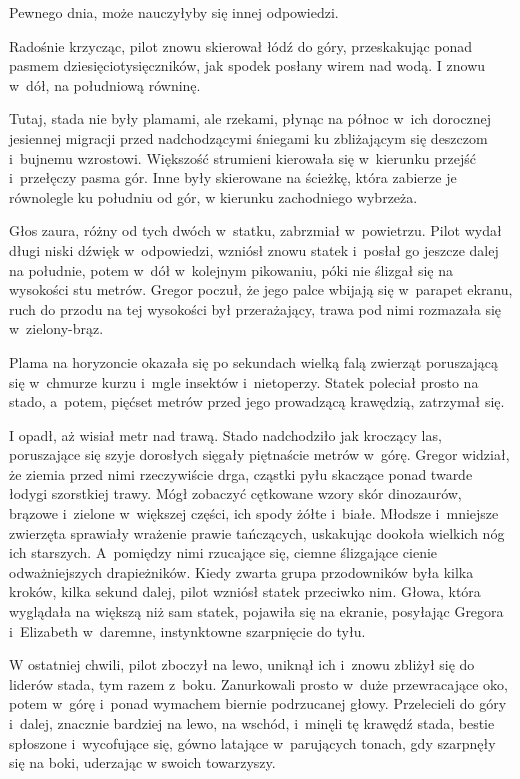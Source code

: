 \documentclass[oneside,polish,12pt,sfheadings]{mwbk}
\begin{document}
Pewnego dnia, może nauczyłyby się innej odpowiedzi.

Radośnie krzycząc, pilot znowu skierował łódź do góry, przeskakując
ponad pasmem dziesięciotysięczników, jak spodek posłany wirem nad wodą.
I znowu w~dół, na południową równinę.

Tutaj, stada nie były plamami, ale rzekami, płynąc na północ w~ich
dorocznej jesiennej migracji przed nadchodzącymi śniegami ku
zbliżającym się deszczom i~bujnemu wzrostowi. Większość strumieni
kierowała się w~kierunku przejść i~przełęczy pasma gór. Inne były
skierowane na ścieżkę, która zabierze je równolegle ku południu od gór,
w kierunku zachodniego wybrzeża.

Głos zaura, różny od tych dwóch w~statku, zabrzmiał w~powietrzu. Pilot
wydał długi niski dźwięk w~odpowiedzi, wzniósł znowu statek i~posłał go
jeszcze dalej na południe, potem w~dół w~kolejnym pikowaniu, póki nie
ślizgał się na wysokości stu metrów. Gregor poczuł, że jego palce
wbijają się w~parapet ekranu, ruch do przodu na tej wysokości był
przerażający, trawa pod nimi rozmazała się w~zielony-brąz.

Plama na horyzoncie okazała się po sekundach wielką falą zwierząt
poruszającą się w~chmurze kurzu i~mgle insektów i~nietoperzy. Statek
poleciał prosto na stado, a~potem, pięćset metrów przed jego prowadzącą
krawędzią, zatrzymał się.

I opadł, aż wisiał metr nad trawą. Stado nadchodziło jak kroczący las,
poruszające się szyje dorosłych sięgały piętnaście metrów w~górę. Gregor
widział, że ziemia przed nimi rzeczywiście drga, cząstki pyłu skaczące
ponad twarde łodygi szorstkiej trawy. Mógł zobaczyć cętkowane wzory skór
dinozaurów, brązowe i~zielone w~większej części, ich spody żółte i~białe. Młodsze i~mniejsze zwierzęta sprawiały wrażenie prawie
tańczących, uskakując dookoła wielkich nóg ich starszych. A~pomiędzy
nimi rzucające się, ciemne ślizgające cienie odważniejszych
drapieżników. Kiedy zwarta grupa przodowników była kilka kroków, kilka
sekund dalej, pilot wzniósł statek przeciwko nim. Głowa, która wyglądała
na większą niż sam statek, pojawiła się na ekranie, posyłając Gregora i~Elizabeth w~daremne, instynktowne szarpnięcie do tyłu.

W ostatniej chwili, pilot zboczył na lewo, uniknął ich i~znowu zbliżył
się do liderów stada, tym razem z~boku. Zanurkowali prosto w~duże
przewracające oko, potem w~górę i~ponad wymachem biernie podrzucanej
głowy. Przelecieli do góry i~dalej, znacznie bardziej na lewo, na
wschód, i~minęli tę krawędź stada, bestie spłoszone i~wycofujące się,
gówno latające w~parujących tonach, gdy szarpnęły się na boki, uderzając
w swoich towarzyszy.
\end{document}
